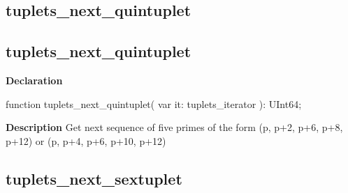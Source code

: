 \documentclass{report}
\newif\ifpdf
\begin{document}
\subsection*{\large{\textbf{tuplets{\_}next{\_}quintuplet}}\normalsize\hspace{1ex}\hrulefill}
\else
\subsection*{tuplets{\_}next{\_}quintuplet}
\fi
\label{primesieve-tuplets_next_quintuplet}
\begin{list}{}{
\setlength{\itemindent}{0cm}
\setlength{\listparindent}{0cm}
\setlength{\leftmargin}{\evensidemargin}
\addtolength{\leftmargin}{\tmplength}
\settowidth{\labelsep}{X}
\addtolength{\leftmargin}{\labelsep}
\setlength{\labelwidth}{\tmplength}
}
\item[\textbf{Declaration}\hfill]
\ifpdf
\begin{flushleft}
\fi
\begin{ttfamily}
function tuplets{\_}next{\_}quintuplet( var it: tuplets{\_}iterator ): UInt64;\end{ttfamily}

\ifpdf
\end{flushleft}
\fi

\par
\item[\textbf{Description}]
Get next sequence of five primes of the form (p, p+2, p+6, p+8, p+12) or (p, p+4, p+6, p+10, p+12)

\end{list}
\ifpdf
\subsection*{\large{\textbf{tuplets{\_}next{\_}sextuplet}}\normalsize\hspace{1ex}\hrulefill}
\else
\end{document}
